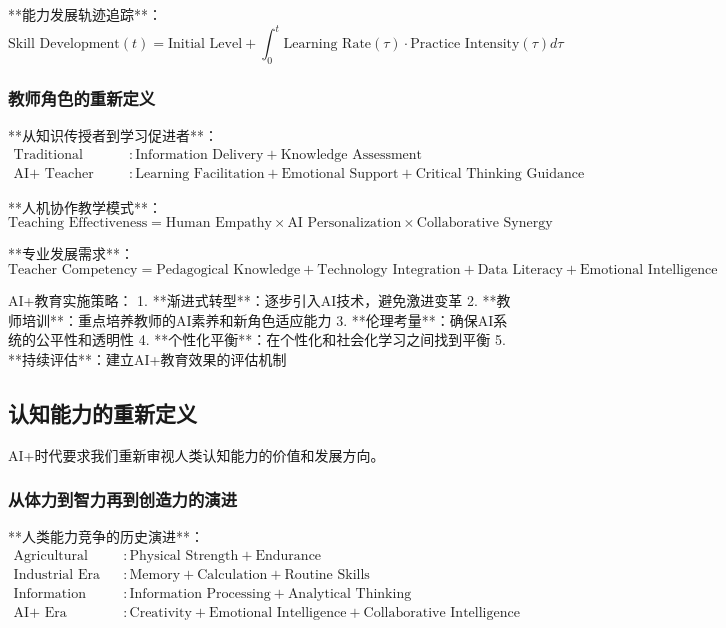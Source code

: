 **能力发展轨迹追踪**：
\begin{equation}
\text{Skill Development}(t) = \text{Initial Level} + \int_0^t \text{Learning Rate}(\tau) \cdot \text{Practice Intensity}(\tau) d\tau
\end{equation}

\subsubsection{教师角色的重新定义} %

**从知识传授者到学习促进者**：
\begin{align}
\text{Traditional Teacher} &: \text{Information Delivery} + \text{Knowledge Assessment} \\
\text{AI+ Teacher} &: \text{Learning Facilitation} + \text{Emotional Support} + \text{Critical Thinking Guidance}
\end{align}

**人机协作教学模式**：
\begin{equation}
\text{Teaching Effectiveness} = \text{Human Empathy} \times \text{AI Personalization} \times \text{Collaborative Synergy}
\end{equation}

**专业发展需求**：
\begin{equation}
\text{Teacher Competency} = \text{Pedagogical Knowledge} + \text{Technology Integration} + \text{Data Literacy} + \text{Emotional Intelligence}
\end{equation}

\begin{center}
AI+教育实施策略：
1. **渐进式转型**：逐步引入AI技术，避免激进变革
2. **教师培训**：重点培养教师的AI素养和新角色适应能力
3. **伦理考量**：确保AI系统的公平性和透明性
4. **个性化平衡**：在个性化和社会化学习之间找到平衡
5. **持续评估**：建立AI+教育效果的评估机制
\end{center}

\subsection{认知能力的重新定义}

AI+时代要求我们重新审视人类认知能力的价值和发展方向。

\subsubsection{从体力到智力再到创造力的演进} %

**人类能力竞争的历史演进**：
\begin{align}
\text{Agricultural Era} &: \text{Physical Strength} + \text{Endurance} \\
\text{Industrial Era} &: \text{Memory} + \text{Calculation} + \text{Routine Skills} \\
\text{Information Era} &: \text{Information Processing} + \text{Analytical Thinking} \\
\text{AI+ Era} &: \text{Creativity} + \text{Emotional Intelligence} + \text{Collaborative Intelligence}
\end{align}

